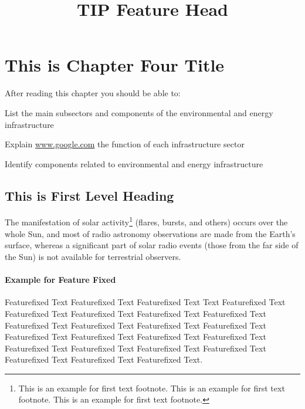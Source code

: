 \chapter{This is Chapter Four Title}

After reading this chapter you should be able to:

\begin{objectives}
\item List the main subsectors and components of the environmental and energy infrastructure

\item Explain \url{www.google.com} the function of each infrastructure sector

\item Identify components related to environmental and energy infrastructure
\end{objectives}

\section{This is First Level Heading}

\lipsum[1-2]

The manifestation of solar activity\footnote{This is an example for first text footnote. This is an example for first text footnote. This is an example for first text footnote.} (flares, bursts, and others) occurs over the whole Sun, and most of radio astronomy observations are made from the Earth's surface, whereas a significant part of solar radio events (those from the far side of the Sun) is not available for terrestrial observers.

\subsubsection*{Example for Feature Fixed}

\begin{featureFixed}[tip]

\title{TIP Feature Head}Featurefixed Text Featurefixed Text Featurefixed Text Text 
Featurefixed Text Featurefixed Text Featurefixed Text Featurefixed Text 
Featurefixed Text Featurefixed Text Featurefixed Text Featurefixed Text 
Featurefixed Text Featurefixed Text Featurefixed Text Featurefixed Text 
Featurefixed Text Featurefixed Text Featurefixed Text Featurefixed Text 
Featurefixed Text Featurefixed Text Featurefixed Text Featurefixed Text.

\end{featureFixed}

